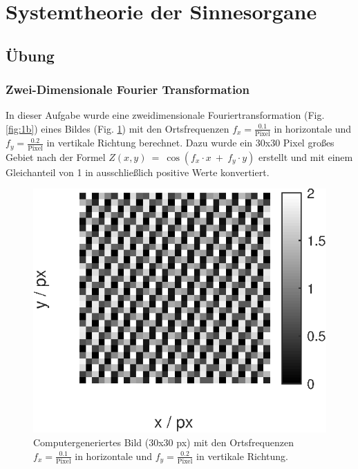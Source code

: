 \section*{Systemtheorie der Sinnesorgane}
\setcounter{subsection}{4} 
\subsection{Übung}
\subsubsection{Zwei-Dimensionale Fourier Transformation}
In dieser Aufgabe wurde eine zweidimensionale Fouriertransformation  (Fig. \ref{fig:1b}) eines Bildes (Fig. \ref{fig:1a}) mit den Ortsfrequenzen $f_x = \frac{0.1}{\mathrm{Pixel}}$ in horizontale und $f_y = \frac{0.2}{\mathrm{Pixel}}$ in vertikale Richtung berechnet. Dazu wurde ein 30x30 Pixel großes Gebiet nach der Formel $Z(x,y)\ =\ \cos(f_x \cdot x\ +\ f_y\cdot y)$ erstellt und mit einem Gleichanteil von 1 in ausschließlich positive Werte konvertiert.

\begin{figure}[h]
    \captionsetup{width=0.8\columnwidth}
    \centering
    \includegraphics[width=.4\columnwidth]{ue5/1a.eps}
    \caption{Computergeneriertes Bild (30x30 px) mit den Ortsfrequenzen $f_x = \frac{0.1}{\mathrm{Pixel}}$ in horizontale und $f_y = \frac{0.2}{\mathrm{Pixel}}$ in vertikale Richtung.}
    \label{fig:1a}
\end{figure}

